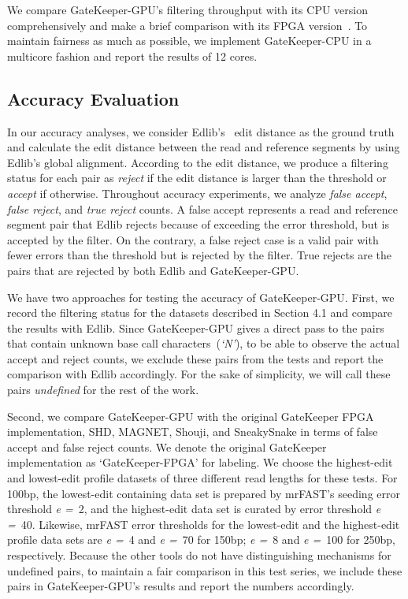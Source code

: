 We compare GateKeeper-GPU's filtering throughput with its CPU version comprehensively and make a brief comparison with its FPGA version~\cite{Alser2017}. To maintain fairness as much as possible, we implement GateKeeper-CPU in a multicore fashion and report the results of 12 cores.   

\subsection{Accuracy Evaluation} 
In our accuracy analyses, we consider Edlib's~\cite{vsovsic2017edlib} edit distance as the ground truth and calculate the edit distance between the read and reference segments by using Edlib's global alignment. According to the edit distance, we produce a filtering status for each pair as \textit{reject} if the edit distance is larger than the threshold or \textit{accept} if otherwise. Throughout accuracy experiments, we analyze \textit{false accept}, \textit{false reject}, and \textit{true reject} counts. A false accept represents a read and reference segment pair that Edlib rejects because of exceeding the error threshold, but is accepted by the filter. On the contrary, a false reject case is a valid pair with fewer errors than the threshold but is rejected by the filter. True rejects are the pairs that are rejected by both Edlib and GateKeeper-GPU.

We have two approaches for testing the accuracy of GateKeeper-GPU. First, we record the filtering status for the datasets described in Section 4.1 and compare the results with Edlib. Since GateKeeper-GPU gives a direct pass to the pairs that contain unknown base call characters~(\textit{`N'}), to be able to observe the actual accept and reject counts, we exclude these pairs from the tests and report the comparison with Edlib accordingly. For the sake of simplicity, we will call these pairs \textit{undefined} for the rest of the work. 

Second, we compare GateKeeper-GPU with the original GateKeeper FPGA implementation, SHD, MAGNET, Shouji, and SneakySnake in terms of false accept and false reject counts. We denote the original GateKeeper implementation as `GateKeeper-FPGA' for labeling. We choose the highest-edit and lowest-edit profile datasets of three different read lengths for these tests. For 100bp, the lowest-edit containing data set is prepared by mrFAST's seeding error threshold \textit{e =}~2, and the highest-edit data set is curated by error threshold \textit{e =}~40. Likewise, mrFAST error thresholds for the lowest-edit and the highest-edit profile data sets are \textit{e =}~4 and \textit{e =}~70 for 150bp; \textit{e =}~8 and \textit{e =}~100 for 250bp, respectively. Because the other tools do not have distinguishing mechanisms for undefined pairs, to maintain a fair comparison in this test series, we include these pairs in GateKeeper-GPU's results and report the numbers accordingly. 

